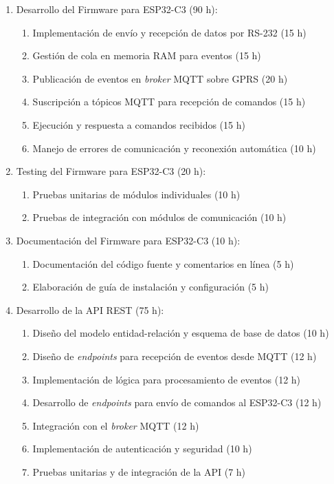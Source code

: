 \documentclass[
11pt, %
]{charter}
\begin{document}
\begin{enumerate}
\item Desarrollo del Firmware para ESP32-C3 (90 h):
\begin{enumerate}
\item Implementación de envío y recepción de datos por RS-232 (15 h)
\item Gestión de cola en memoria RAM para eventos (15 h)
\item Publicación de eventos en \textit{broker} MQTT sobre GPRS (20 h)
\item Suscripción a tópicos MQTT para recepción de comandos (15 h)
\item Ejecución y respuesta a comandos recibidos (15 h)
\item Manejo de errores de comunicación y reconexión automática (10 h)
\end{enumerate}
\item Testing del Firmware para ESP32-C3 (20 h):
\begin{enumerate}
\item Pruebas unitarias de módulos individuales (10 h)
\item Pruebas de integración con módulos de comunicación (10 h)
\end{enumerate}
\item Documentación del Firmware para ESP32-C3 (10 h):
\begin{enumerate}
\item Documentación del código fuente y comentarios en línea (5 h)
\item Elaboración de guía de instalación y configuración (5 h)
\end{enumerate}
\item Desarrollo de la API REST (75 h):
\begin{enumerate}
  \item Diseño del modelo entidad-relación y esquema de base de datos (10 h)
  \item Diseño de \textit{endpoints} para recepción de eventos desde MQTT (12 h)
  \item Implementación de lógica para procesamiento de eventos (12 h)
  \item Desarrollo de \textit{endpoints} para envío de comandos al ESP32-C3 (12 h)
  \item Integración con el  \textit{broker} MQTT (12 h)
  \item Implementación de autenticación y seguridad (10 h)
  \item Pruebas unitarias y de integración de la API (7 h)
\end{enumerate}

\end{enumerate}
\end{document}
